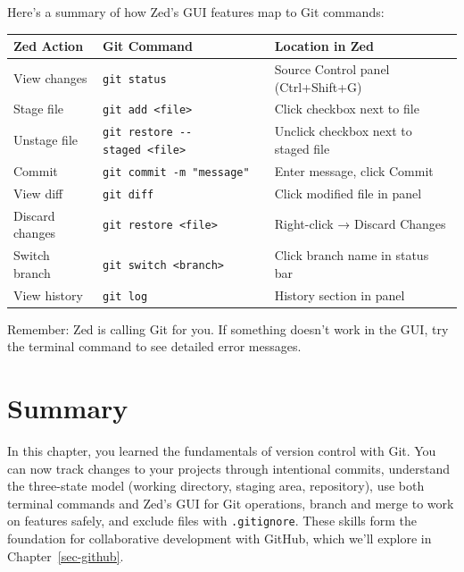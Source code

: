 \documentclass[
  letterpaper,
  DIV=11,
  numbers=noendperiod]{scrreprt}
\begin{document}
Here's a summary of how Zed's GUI features map to Git commands:

\begin{longtable}[]{@{}
  >{\raggedright\arraybackslash}p{}
  >{\raggedright\arraybackslash}p{}
  >{\raggedright\arraybackslash}p{}@{}}
\toprule\noalign{}
\begin{minipage}[b]{\linewidth}\raggedright
Zed Action
\end{minipage} & \begin{minipage}[b]{\linewidth}\raggedright
Git Command
\end{minipage} & \begin{minipage}[b]{\linewidth}\raggedright
Location in Zed
\end{minipage} \\
\midrule\noalign{}
\endhead
\bottomrule\noalign{}
\endlastfoot
View changes & \texttt{git\ status} & Source Control panel
(Ctrl+Shift+G) \\
Stage file & \texttt{git\ add\ \textless{}file\textgreater{}} & Click
checkbox next to file \\
Unstage file &
\texttt{git\ restore\ -\/-staged\ \textless{}file\textgreater{}} &
Unclick checkbox next to staged file \\
Commit & \texttt{git\ commit\ -m\ "message"} & Enter message, click
Commit \\
View diff & \texttt{git\ diff} & Click modified file in panel \\
Discard changes & \texttt{git\ restore\ \textless{}file\textgreater{}} &
Right-click → Discard Changes \\
Switch branch & \texttt{git\ switch\ \textless{}branch\textgreater{}} &
Click branch name in status bar \\
View history & \texttt{git\ log} & History section in panel \\
\end{longtable}

Remember: Zed is calling Git for you. If something doesn't work in the
GUI, try the terminal command to see detailed error messages.

\section{Summary}\label{summary-3}

In this chapter, you learned the fundamentals of version control with
Git. You can now track changes to your projects through intentional
commits, understand the three-state model (working directory, staging
area, repository), use both terminal commands and Zed's GUI for Git
operations, branch and merge to work on features safely, and exclude
files with \texttt{.gitignore}. These skills form the foundation for
collaborative development with GitHub, which we'll explore in
Chapter~\ref{sec-github}.
\end{document}
